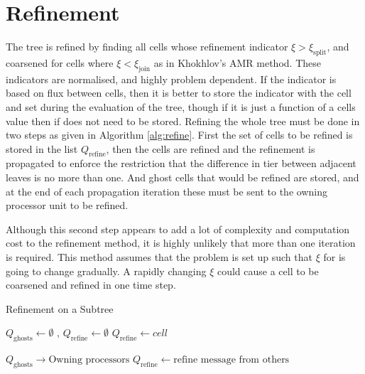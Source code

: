 \documentclass[12pt]{article}
\begin{document}
\section{Refinement}

The tree is refined by finding all cells whose refinement indicator $\xi > \xi_{\mathrm{split}}$, and coarsened for cells where $\xi < \xi_{\mathrm{join}}$ as in Khokhlov's AMR method. These indicators are normalised, and highly problem dependent. If the indicator is based on flux between cells, then it is better to store the indicator with the cell and set during the evaluation of the tree, though if it is just a function of a cells value then if does not need to be stored. Refining the whole tree must be done in two steps as given in Algorithm \ref{alg:refine}. First the set of cells to be refined is stored in the list $Q_\mathrm{refine}$, then the cells are refined and the refinement is propagated to enforce the restriction that the difference in tier between adjacent leaves is no more than one. And ghost cells that would be refined are stored, and at the end of each propagation iteration these must be sent to the owning processor unit to be refined.

Although this second step appears to add a lot of complexity and computation cost to the refinement method, it is highly unlikely that more than one iteration is required. This method assumes that the problem is set up such that $\xi$ for is going to change gradually. A rapidly changing $\xi$ could cause a cell to be coarsened and refined in one time step. 

\begin{algorithm}[H]
\caption{Refinement on a Subtree}
\label{alg:refine}

\begin{algorithmic}
	\State $Q_{\mathrm{ghosts}} \gets \emptyset \text{ , } Q_{\mathrm{refine}} \gets \emptyset$
			\State $Q_{\mathrm{refine}} \gets cell$
			\State {}
		\EndIf
	\EndFor
	\Statex
	\Repeat
			\State {}
			\State {}
		\EndFor

		\State $Q_\mathrm{ghosts} \to \text{Owning processors}$
		\State $Q_{\mathrm{refine}} \gets \text{refine message from others}$
\EndFunction
\end{algorithmic}
\end{algorithm}
\end{document}
